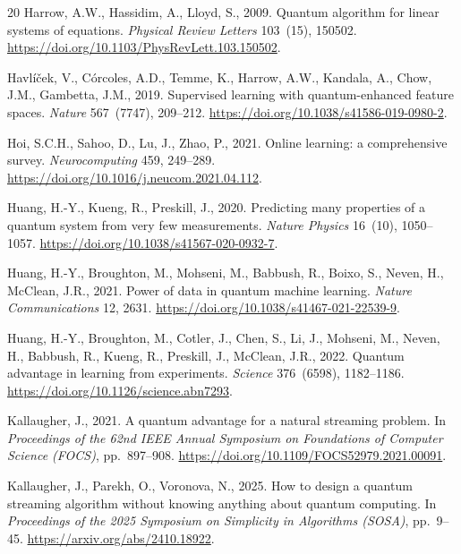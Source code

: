 \documentclass[preprint,12pt,authoryear]{elsarticle}
\begin{document}
\begin{thebibliography}{20}
Harrow, A.W., Hassidim, A., Lloyd, S., 2009.
\newblock Quantum algorithm for linear systems of equations.
\newblock \emph{Physical Review Letters} 103~(15), 150502.
\newblock \url{https://doi.org/10.1103/PhysRevLett.103.150502}.

Havl\'i\v{c}ek, V., C\'orcoles, A.D., Temme, K., Harrow, A.W., Kandala, A., Chow, J.M., Gambetta, J.M., 2019.
\newblock Supervised learning with quantum-enhanced feature spaces.
\newblock \emph{Nature} 567~(7747), 209--212.
\newblock \url{https://doi.org/10.1038/s41586-019-0980-2}.

Hoi, S.C.H., Sahoo, D., Lu, J., Zhao, P., 2021.
\newblock Online learning: a comprehensive survey.
\newblock \emph{Neurocomputing} 459, 249--289.
\newblock \url{https://doi.org/10.1016/j.neucom.2021.04.112}.

Huang, H.-Y., Kueng, R., Preskill, J., 2020.
\newblock Predicting many properties of a quantum system from very few measurements.
\newblock \emph{Nature Physics} 16~(10), 1050--1057.
\newblock \url{https://doi.org/10.1038/s41567-020-0932-7}.

Huang, H.-Y., Broughton, M., Mohseni, M., Babbush, R., Boixo, S., Neven, H., McClean, J.R., 2021.
\newblock Power of data in quantum machine learning.
\newblock \emph{Nature Communications} 12, 2631.
\newblock \url{https://doi.org/10.1038/s41467-021-22539-9}.

Huang, H.-Y., Broughton, M., Cotler, J., Chen, S., Li, J., Mohseni, M., Neven, H., Babbush, R., Kueng, R., Preskill, J., McClean, J.R., 2022.
\newblock Quantum advantage in learning from experiments.
\newblock \emph{Science} 376~(6598), 1182--1186.
\newblock \url{https://doi.org/10.1126/science.abn7293}.

Kallaugher, J., 2021.
\newblock A quantum advantage for a natural streaming problem.
\newblock In \emph{Proceedings of the 62nd IEEE Annual Symposium on Foundations of Computer Science (FOCS)}, pp.~897--908.
\newblock \url{https://doi.org/10.1109/FOCS52979.2021.00091}.

Kallaugher, J., Parekh, O., Voronova, N., 2025.
\newblock How to design a quantum streaming algorithm without knowing anything about quantum computing.
\newblock In \emph{Proceedings of the 2025 Symposium on Simplicity in Algorithms (SOSA)}, pp.~9--45.
\newblock \url{https://arxiv.org/abs/2410.18922}.


\end{thebibliography}
\end{document}
